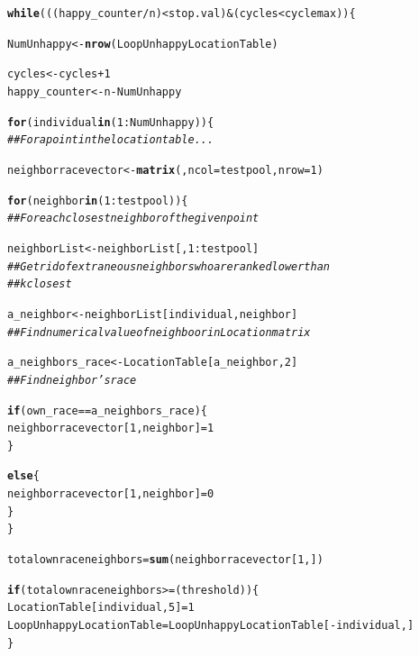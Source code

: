 \documentclass{article}\usepackage[]{graphicx}\usepackage[]{color}
\makeatletter
\newcommand{\hlnum}[1]{\textcolor[rgb]{0.686,0.059,0.569}{#1}}%
\newcommand{\hlcom}[1]{\textcolor[rgb]{0.678,0.584,0.686}{\textit{#1}}}%
\newcommand{\hlopt}[1]{\textcolor[rgb]{0,0,0}{#1}}%
\newcommand{\hlstd}[1]{\textcolor[rgb]{0.345,0.345,0.345}{#1}}%
\newcommand{\hlkwa}[1]{\textcolor[rgb]{0.161,0.373,0.58}{\textbf{#1}}}%
\newcommand{\hlkwb}[1]{\textcolor[rgb]{0.69,0.353,0.396}{#1}}%
\newcommand{\hlkwc}[1]{\textcolor[rgb]{0.333,0.667,0.333}{#1}}%
\newcommand{\hlkwd}[1]{\textcolor[rgb]{0.737,0.353,0.396}{\textbf{#1}}}%
\newenvironment{kframe}{%
 \def\at@end@of@kframe{}%
 \ifinner\ifhmode%
  \def\at@end@of@kframe{\end{minipage}}%
  \begin{minipage}{\columnwidth}%
 \fi\fi%
 \def\FrameCommand##1{\hskip\@totalleftmargin \hskip-\fboxsep
 \colorbox{shadecolor}{##1}\hskip-\fboxsep
     \hskip-\linewidth \hskip-\@totalleftmargin \hskip\columnwidth}%
 \MakeFramed {\advance\hsize-\width
   \@totalleftmargin\z@ \linewidth\hsize
   \@setminipage}}%
 {\par\unskip\endMakeFramed%
 \at@end@of@kframe}
\newenvironment{knitrout}{}{} %
\makeatother
\begin{document}
\begin{knitrout}
\begin{kframe}
\begin{alltt}
\hlkwa{while} \hlstd{(((happy_counter}\hlopt{/}\hlstd{n)} \hlopt{<} \hlstd{stop.val)} \hlopt{&} \hlstd{(cycles} \hlopt{<} \hlstd{cyclemax))\{}

     \hlstd{NumUnhappy} \hlkwb{<-} \hlkwd{nrow}\hlstd{(LoopUnhappyLocationTable)}

     \hlstd{cycles} \hlkwb{<-} \hlstd{cycles} \hlopt{+} \hlnum{1}
     \hlstd{happy_counter}\hlkwb{<-} \hlstd{n} \hlopt{-} \hlstd{NumUnhappy}


     \hlkwa{for} \hlstd{(individual} \hlkwa{in} \hlstd{(}\hlnum{1}\hlopt{:}\hlstd{NumUnhappy))\{}
     \hlcom{##For a point in the location table...}

       \hlstd{neighborracevector} \hlkwb{<-} \hlkwd{matrix}\hlstd{(,} \hlkwc{ncol} \hlstd{= testpool,} \hlkwc{nrow} \hlstd{=} \hlnum{1} \hlstd{)}

       \hlkwa{for} \hlstd{(neighbor} \hlkwa{in} \hlstd{(}\hlnum{1}\hlopt{:}\hlstd{testpool))\{}
       \hlcom{## For each closest neighbor of the given point}

         \hlstd{neighborList} \hlkwb{<-} \hlstd{neighborList[,}\hlnum{1}\hlopt{:}\hlstd{testpool]}
         \hlcom{##Get rid of extraneous neighbors who are ranked lower than}
         \hlcom{## k closest}

         \hlstd{a_neighbor} \hlkwb{<-} \hlstd{neighborList[individual,neighbor]}
         \hlcom{## Find numerical value of neighboor in Location matrix}

         \hlstd{a_neighbors_race} \hlkwb{<-} \hlstd{LocationTable[a_neighbor,}\hlnum{2}\hlstd{]}
         \hlcom{## Find neighbor's race}

         \hlkwa{if} \hlstd{(own_race} \hlopt{==} \hlstd{a_neighbors_race)\{}
           \hlstd{neighborracevector[}\hlnum{1}\hlstd{,neighbor]} \hlkwb{=} \hlnum{1}
         \hlstd{\}}

         \hlkwa{else}\hlstd{\{}
           \hlstd{neighborracevector[}\hlnum{1}\hlstd{,neighbor]} \hlkwb{=} \hlnum{0}
         \hlstd{\}}
      \hlstd{\}}


      \hlstd{totalownraceneighbors} \hlkwb{=} \hlkwd{sum}\hlstd{(neighborracevector[}\hlnum{1}\hlstd{,])}



      \hlkwa{if} \hlstd{(totalownraceneighbors} \hlopt{>=} \hlstd{(threshold))\{}
           \hlstd{LocationTable[individual,}\hlnum{5}\hlstd{]} \hlkwb{=} \hlnum{1}
           \hlstd{LoopUnhappyLocationTable} \hlkwb{=} \hlstd{LoopUnhappyLocationTable[}\hlopt{-}\hlstd{individual,]}
        \hlstd{\}}


\end{alltt}
\end{kframe}
\end{knitrout}
\end{document}
